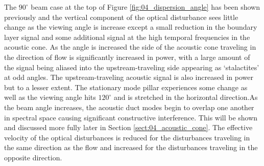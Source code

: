 The $90^\circ$ beam case at the top of Figure \ref{fig:04_dispersion_angle} has been shown previously and the vertical component of the optical  disturbance sees little change as the viewing angle is increase except a small reduction in the boundary layer signal and some additional signal at the high temporal frequencies in the acoustic cone.
As the angle is increased the side of the acoustic cone traveling in the direction of flow is significantly increased in power, with a large amount of the signal being aliased into the upstream-traveling side appearing as `stalactites' at odd angles.
The upstream-traveling acoustic signal is also increased in power but to a lesser extent.
The stationary mode pillar experiences some change as well as the viewing angle hits $120^\circ$ and is stretched in the horizontal direction.As the beam angle increases, the acoustic duct modes begin to overlap one another in spectral space causing significant constructive interference.
This will be shown and discussed more fully later in Section \ref{sect:04_acoustic_cone}.
The effective velocity of the optical disturbances is reduced for the disturbances traveling in the same direction as the flow and increased for the disturbances traveling in the opposite direction.


